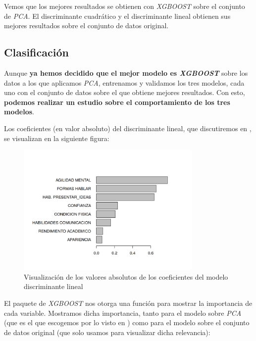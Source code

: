 \documentclass[11pt]{article}
\begin{document}
Vemos que los mejores resultados se obtienen con \textit{XGBOOST} sobre el conjunto de \textit{PCA}. El discriminante cuadrático y el discriminante lineal obtienen sus mejores resultados sobre el conjunto de datos original.

\subsection{Clasificación}

Aunque \textbf{ya hemos decidido que el mejor modelo es \textit{XGBOOST}} sobre los datos a los que aplicamos \textit{PCA}, entrenamos y validamos los tres modelos, cada uno con el conjunto de datos sobre el que obtiene mejores resultados. Con esto, \textbf{podemos realizar un estudio sobre el comportamiento de los tres modelos}.

Los coeficientes (en valor absoluto) del discriminante lineal, que discutiremos en , se visualizan en la siguiente figura:

\begin{figure}[H]
    \centering
    \includegraphics[width=0.8\textwidth]{coeficientes_lda}
    \caption{Visualización de los valores absolutos de los coeficientes del modelo discriminante lineal}
\end{figure}

El paquete de \textit{XGBOOST} nos otorga una función para mostrar la importancia de cada variable. Mostramos dicha importancia, tanto para el modelo sobre \textit{PCA} (que es el que escogemos por lo visto en ) como para el modelo sobre el conjunto de datos original (que solo usamos para visualizar dicha relevancia):
\end{document}
